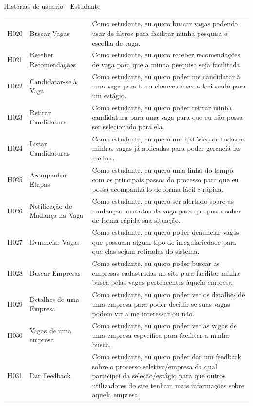 \begin{quadro}[H]
	\centering
	\ABNTEXfontereduzida
	\caption{Histórias de usuário - Estudante}
	\label{user-story-student}
	\begin{tabular}{|l|p{4cm}|p{9cm}|}
		\hline 
		\thead{Código} & \thead[l]{Nome} & \thead[l]{Descrição} \\
		\hline
		H020 & Buscar Vagas & Como estudante, eu quero buscar vagas podendo usar de filtros para facilitar minha pesquisa e escolha de vaga. \\
		\hline
		H021 & Receber Recomendações & Como estudante, eu quero receber recomendações de vaga para que a minha pesquisa seja facilitada.\\
		\hline
		H022 & Candidatar-se à Vaga & Como estudante, eu quero poder me candidatar à uma vaga para ter a chance de ser selecionado para um estágio. \\
		\hline
		H023 & Retirar Candidatura & Como estudante, eu quero poder retirar minha candidatura para uma vaga para que eu não possa ser selecionado para ela. \\
		\hline
		H024 & Listar Candidaturas & Como estudante, eu quero um histórico de todas as minhas vagas já aplicadas para poder gerenciá-las melhor. \\
		\hline
		H025 & Acompanhar Etapas & Como estudante, eu quero uma linha do tempo com os principais passos do processo para que eu possa acompanhá-lo de forma fácil e rápida.\\
		\hline
		H026 & Notificação de Mudança na Vaga & Como estudante, eu quero ser alertado sobre as mudanças no status da vaga para que possa saber de forma rápida sua situação. \\
		\hline
		H027 & Denunciar Vagas & Como estudante, eu quero poder denunciar vagas que possuam algum tipo de irregulariedade para que elas sejam retiradas do sistema. \\
		\hline
		H028 & Buscar Empresas & Como estudante, eu quero poder buscar as empresas cadastradas no site para facilitar minha busca pelas vagas pertencentes àquela empresa. \\
		\hline
		H029 & Detalhes de uma Empresa & Como estudante, eu quero poder ver os detalhes de uma empresa para poder decidir se suas vagas podem vir a me interessar ou não. \\
		\hline
		H030 &  Vagas de uma empresa & Como estudante, eu quero poder ver as vagas de uma empresa específica para facilitar a minha busca. \\
		\hline
		H031 & Dar Feedback & Como estudante, eu quero poder dar um feedback sobre o processo seletivo/empresa da qual participei da seleção/estágio para que outros utilizadores do site tenham mais informações sobre aquela empresa. \\

\end{tabular}
\end{quadro}
